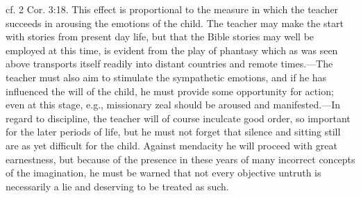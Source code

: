 cf. 2 Cor. 3:18. This effect is proportional to the measure in which the teacher succeeds in arousing the emotions of the child. The teacher may make the start with stories from present day life, but that the Bible stories may well be employed at this time, is evident from the play of phantasy which as was seen above transports itself readily into distant countries and remote times.—The teacher must also aim to stimulate the sympathetic emotions, and if he has influenced the will of the child, he must provide some opportunity for action; even at this stage, e.g., missionary zeal should be aroused and manifested.—In regard to discipline, the teacher will of course inculcate good order, so important for the later periods of life, but he must not forget that silence and sitting still are as yet difficult for the child. Against mendacity he will proceed with great earnestness, but because of the presence in these years of many incorrect concepts of the imagination, he must be warned that not every objective untruth is necessarily a lie and deserving to be treated as such.

